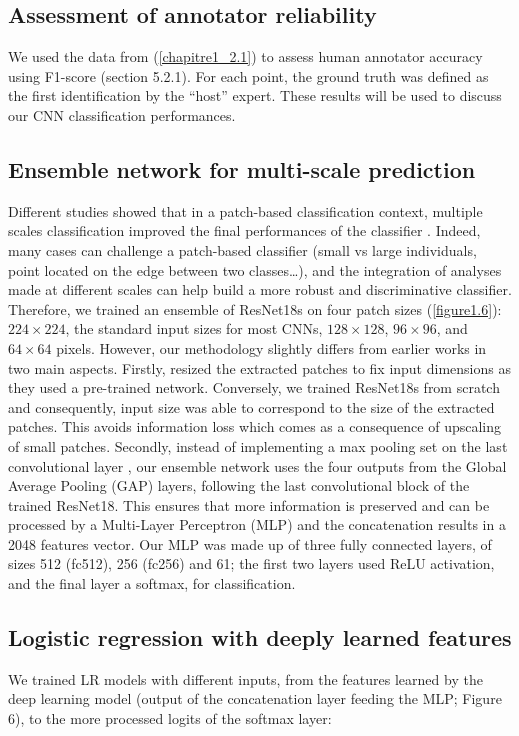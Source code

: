 \subsection{Assessment of annotator reliability}\label{chapitre1_4.1}
We used the data from \citet{beijbom_towards_2015} (\autoref{chapitre1_2.1}) to assess human annotator accuracy using F1-score (section 5.2.1). For each point, the ground truth was defined as the first identification by the “host” expert. These results will be used to discuss our CNN classification performances.

\subsection{Ensemble network for multi-scale prediction}\label{chapitre1_4.2}
Different studies showed that in a patch-based classification context, multiple scales classification improved the final performances of the classifier \citep{beijbom_automated_2012, mahmood_coral_2016}. Indeed, many cases can challenge a patch-based classifier (small vs large individuals, point located on the edge between two classes…), and the integration of analyses made at different scales can help build a more robust and discriminative classifier. Therefore, we trained an ensemble of ResNet18s on four patch sizes (\autoref{figure1.6}): \(224 \times 224\), the standard input sizes for most CNNs, \(128 \times 128\), \(96 \times 96\), and \(64 \times 64\) pixels. However, our methodology slightly differs from earlier works in two main aspects. Firstly, \citet{mahmood_coral_2016} resized the extracted patches to fix input dimensions as they used a pre-trained network. Conversely, we trained ResNet18s from scratch and consequently, input size was able to correspond to the size of the extracted patches. This avoids information loss which comes as a consequence of upscaling of small patches. Secondly, instead of implementing a max pooling set on the last convolutional layer \citep{mahmood_coral_2016}, our ensemble network uses the four outputs from the Global Average Pooling (GAP) layers, following the last convolutional block of the trained ResNet18. This ensures that more information is preserved and can be processed by a Multi-Layer Perceptron (MLP) and the concatenation results in a 2048 features vector. Our MLP was made up of three fully connected layers, of sizes 512 (fc512), 256 (fc256) and 61; the first two layers used ReLU activation, and the final layer a softmax, for classification.


\subsection{Logistic regression with deeply learned features}\label{chapitre1_4.3}
We trained LR models with different inputs, from the features learned by the deep learning model (output of the concatenation layer feeding the MLP; Figure 6), to the more processed logits of the softmax layer:

